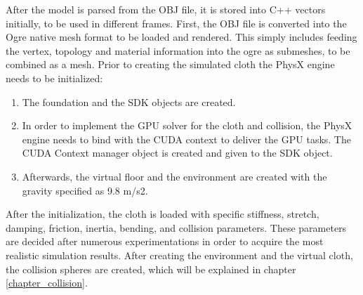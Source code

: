 After the model is parsed from the OBJ file, it is stored into C++ vectors initially, to be used in different frames. First, the OBJ file is converted into the Ogre native mesh format to be loaded and rendered. This simply includes feeding the vertex, topology and material information into the ogre as submeshes, to be combined as a mesh.
Prior to creating the simulated cloth the PhysX engine needs to be initialized:

\begin{enumerate}
\item The foundation and the SDK objects are created.
\item In order to implement the GPU solver for the cloth and collision, the PhysX engine needs to bind with the CUDA context to deliver the GPU tasks. The CUDA Context manager object is created and given to the SDK object.
\item Afterwards, the virtual floor and the environment are created with the gravity specified as 9.8 m/s2. 
\end{enumerate}

After the initialization, the cloth is loaded with specific stiffness, stretch, damping, friction, inertia, bending, and collision parameters. These parameters are decided after numerous experimentations in order to acquire the most realistic simulation results.
After creating the environment and the virtual cloth, the collision spheres are created, which will be explained in chapter \ref{chapter_collision}.

